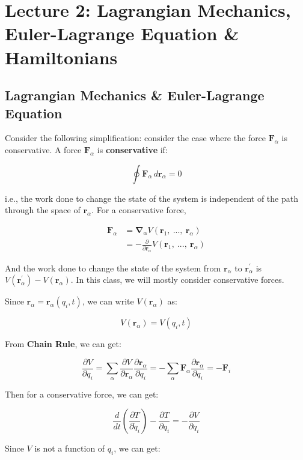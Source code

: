 \section{Lecture 2: Lagrangian Mechanics, Euler-Lagrange Equation \& Hamiltonians}

\subsection{Lagrangian Mechanics \& Euler-Lagrange Equation}

Consider the following simplification: consider the case where the force $\mathbf{F}_\alpha$ is conservative. A force $\mathbf{F}_\alpha$ is \textbf{conservative} if:

\[
    \oint \mathbf{F}_\alpha \, d\mathbf{r}_\alpha = 0
\]

i.e., the work done to change the state of the system is independent of the path through the space of $\mathbf{r}_\alpha$. For a conservative force, 

\begin{align*}
    \mathbf{F}_\alpha &= \mathbf{\nabla}_\alpha V(\mathbf{r}_1,\ ...,\ \mathbf{r}_\alpha) \\
    &= - \frac{\partial}{\partial \mathbf{r}_\alpha} V(\mathbf{r}_1,\ ...,\ \mathbf{r}_\alpha)
\end{align*}

And the work done to change the state of the system from $\mathbf{r}_\alpha$ to $\mathbf{r}_\alpha^\prime$ is $V(\mathbf{r}_\alpha^\prime)-V(\mathbf{r}_\alpha)$. In this class, we will mostly consider conservative forces.

Since $\mathbf{r}_\alpha=\mathbf{r}_\alpha(q_i, t)$, we can write $V(\mathbf{r}_\alpha)$ as:

\[
    V(\mathbf{r}_\alpha)=V(q_i, t)
\]

From \textbf{Chain Rule}, we can get:

\[
    \frac{\partial V}{\partial q_i}=\sum_\alpha \frac{\partial V}{\partial \mathbf{r}_\alpha} \frac{\partial \mathbf{r}_\alpha}{\partial q_i}=-\sum_\alpha \mathbf{F}_\alpha \frac{\partial \mathbf{r}_\alpha}{\partial q_i}=-\mathbf{F}_i
\]

Then for a conservative force, we can get:

\[
    \frac{d}{dt} (\frac{\partial T}{\partial \dot{q}_i}) - \frac{\partial T}{\partial q_i} = -\frac{\partial V}{\partial q_i}
\]

Since $V$ is not a function of $q_i$, we can get:

